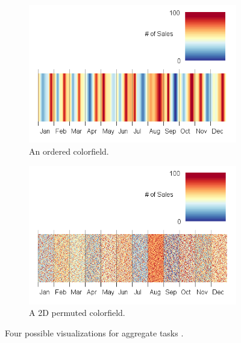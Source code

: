 \documentclass{article} %
\begin{document}
\begin{figure}
\begin{subfigure}[b]{0.45\textwidth}
                \includegraphics[width=\textwidth]{figures/conditions-c.png}
                \caption{An ordered colorfield.}
                \label{fig:avg_color}
        \end{subfigure}
        \begin{subfigure}[b]{0.45\textwidth}
                \includegraphics[width=\textwidth]{figures/conditions-d.png}
                \caption{A 2D permuted colorfield.}
                \label{fig:avg_color_p}
        \end{subfigure}
        \caption{Four possible visualizations for aggregate tasks \cite{correll2012}.}
        \label{fig:avg}
\end{figure}
\end{document}
